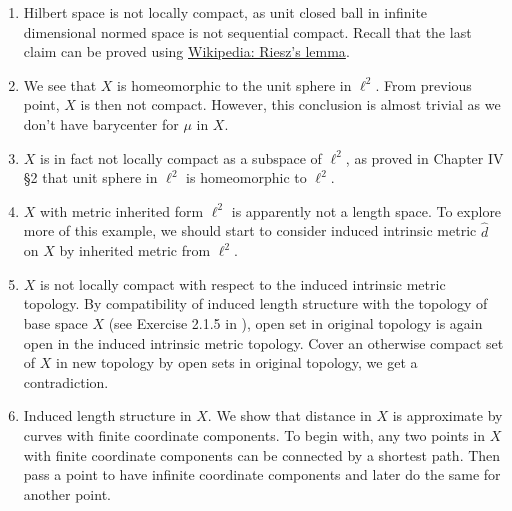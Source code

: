 \begin{rmk}
	\begin{enumerate}
		\item Hilbert space is not locally compact, as unit closed ball in infinite dimensional normed space is not sequential compact. Recall that the last claim can be proved using \href{https://en.wikipedia.org/wiki/Riesz%27s_lemma}{Wikipedia: Riesz's lemma}.
		\item %
		      We see that $X$ is homeomorphic to the unit sphere in $\ell^2$. From previous point, $X$ is then not compact. However, this conclusion is almost trivial as we don't have barycenter for $\mu$ in $X$.
		\item $X$ is in fact not locally compact as a subspace of $\ell^2$, as proved in \cite{bessaga1975selected} Chapter IV §2 that unit sphere in $\ell^2$ is homeomorphic to $\ell^2$.
		\item $X$ with metric inherited form $\ell^2$ is apparently not a length space. To explore more of this example, we should start to consider induced intrinsic metric $\hat{d}$ on $X$ by inherited metric from $\ell^2$.
		\item $X$ is not locally compact with respect to the induced intrinsic metric topology. By compatibility of induced length structure with the topology of base space $X$ (see Exercise 2.1.5 in \cite{burago2001course}), open set in original topology is again open in the induced intrinsic metric topology. Cover an otherwise compact set of $X$ in new topology by open sets in original topology, we get a contradiction.
		\item %
		      Induced length structure in $X$. %
		      We show that distance in $X$ is approximate by curves with finite coordinate components. To begin with, any two points in $X$ with finite coordinate components can be connected by a shortest path. Then pass a point to have infinite coordinate components and later do the same for another point.

\end{enumerate}
\end{rmk}

